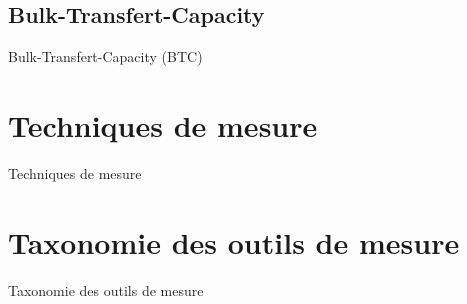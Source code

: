 \documentclass[compress]{beamer}
\begin{document}
\subsection{Bulk-Transfert-Capacity}
\begin{frame}{Bulk-Transfert-Capacity (BTC)}

\end{frame}

\section{Techniques de mesure}
\begin{frame}{Techniques de mesure}

\end{frame}

\section{Taxonomie des outils de mesure}
\begin{frame}{Taxonomie des outils de mesure}

\end{frame}
\end{document}
